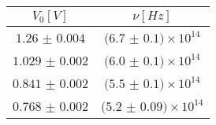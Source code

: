 \begin{tabular}{cc}
\hline
	$V_0[V]$ & $\nu[Hz]$\\ 
\hline
	$1.26$ $\pm$ $0.004$ & $(6.7$ $\pm$ $0.1)\times 10^{14}$ \\
	$1.029$ $\pm$ $0.002$ & $(6.0$ $\pm$ $0.1)\times 10^{14}$ \\
	$0.841$ $\pm$ $0.002$ & $(5.5$ $\pm$ $0.1)\times 10^{14}$ \\
	$0.768$ $\pm$ $0.002$ & $(5.2$ $\pm$ $0.09)\times 10^{14}$ \\
\hline
\end{tabular}
